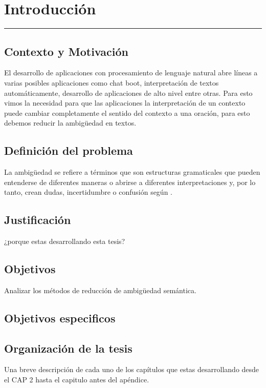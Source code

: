 \chapter{Introducción}
\hrule \bigskip \vspace*{1cm}
\section{Contexto y Motivación}
El desarrollo de aplicaciones con procesamiento de lenguaje natural abre líneas a varias posibles aplicaciones como chat boot, interpretación de textos automáticamente, desarrollo de aplicaciones de alto nivel entre otras. Para esto vimos la necesidad para que las aplicaciones la interpretación de un contexto puede cambiar completamente el sentido del contexto a una oración, para esto debemos reducir la ambigüedad en textos. 

\section{Definición del problema}
La ambigüedad se refiere a términos que son estructuras gramaticales que pueden entenderse de diferentes maneras o abrirse a diferentes interpretaciones y, por lo tanto, crean dudas, incertidumbre o confusión según \cite{EvaluacionAmbiguedad01}.

 

\section{Justificación}

¿porque estas desarrollando esta tesis?

\section{Objetivos}

 Analizar los métodos de reducción de ambigüedad semántica.

\section{Objetivos especificos}

\section{Organización de la tesis}

Una breve descripción de cada uno de los capítulos que estas
desarrollando desde el CAP 2 hasta el capitulo antes del apéndice.
